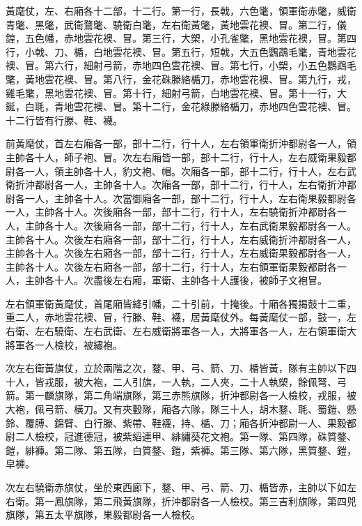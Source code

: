 \begin{pinyinscope}
 黃麾仗，左、右廂各十二部，十二行。第一行，長戟，六色氅，領軍衛赤氅，威衛青氅、黑氅，武衛鶩氅、驍衛白氅，左右衛黃氅，黃地雲花襖、冒。第二行，儀鍠，五色幡，赤地雲花襖、冒。第三行，大槊，小孔雀氅，黑地雲花襖，冒。第四行，小戟、刀、楯，白地雲花襖、冒。第五行，短戟，大五色鸚鵡毛氅，青地雲花襖、冒。第六行，細射弓箭，赤地四色雲花襖、冒。第七行，小槊，小五色鸚鵡毛氅，黃地雲花襖、冒。第八行，金花硃滕絡楯刀，赤地雲花襖、冒。第九行，戎，雞毛氅，黑地雲花襖、冒。第十行，細射弓箭，白地雲花襖、冒。第十一行，大鋋，白毦，青地雲花襖、冒。第十二行，金花綠滕絡楯刀，赤地四色雲花襖、冒。十二行皆有行滕、鞋、襪。



 前黃麾仗，首左右廂各一部，部十二行，行十人，左右領軍衛折沖都尉各一人，領主帥各十人，師子袍、冒。次左右廂皆一部，部十二行，行十人，左右威衛果毅都尉各一人，領主帥各十人，豹文袍、帽。次廂各一部，部十二行，行十人，左右武衛折沖都尉各一人，主帥各十人。次廂各一部，部十二行，行十人，左右衛折沖都尉各一人，主帥各十人。次當御廂各一部，部十二行，行十人，左右衛果毅都尉各一人，主帥各十人。次後廂各一部，部十二行，行十人，左右驍衛折沖都尉各一人，主帥各十人。次後廂各一部，部十二行，行十人，左右武衛果毅都尉各一人。主帥各十人。次後左右廂各一部，部十二行，行十人，左右威衛折沖都尉各一人，主帥各十人。次後左右廂各一部，部十二行，行十人，左右威衛果毅都尉各一人，主帥各十人。次後左右廂各一部，部十二行，行十人，左右領軍衛果毅都尉各一人，主帥各十人。次盡後左右廂，軍衛、主帥各十人護後，被師子文袍冒。



 左右領軍衛黃麾仗，首尾廂皆絳引幡，二十引前，十掩後。十廂各獨揭鼓十二重，重二人，赤地雲花襖、冒，行滕、鞋、襪，居黃麾仗外。每黃麾仗一部，鼓一，左右衛、左右驍衛、左右武衛、左右威衛將軍各一人，大將軍各一人，左右領軍衛大將軍各一人檢校，被繡袍。



 次左右衛黃旗仗，立於兩階之次，鍪、甲、弓、箭、刀、楯皆黃，隊有主帥以下四十人，皆戎服，被大袍，二人引旗，一人執，二人夾，二十人執槊，餘佩弩、弓箭。第一麟旗隊，第二角端旗隊，第三赤熊旗隊，折沖都尉各一人檢校，戎服，被大袍，佩弓箭、橫刀。又有夾轂隊，廂各六隊，隊三十人，胡木鍪、毦、蜀鎧、懸鈴、覆膊、錦臂、白行滕、紫帶、鞋襪，持、楯、刀；廂各折沖都尉一人、果毅都尉二人檢校，冠進德冠，被紫縚連甲、緋繡葵花文袍。第一隊、第四隊，硃質鍪、鎧，緋褲。第二隊、第五隊，白質鍪、鎧，紫褲。第三隊、第六隊，黑質鍪、鎧，皁褲。



 次左右驍衛赤旗仗，坐於東西廊下，鍪、甲、弓、箭、刀、楯皆赤，主帥以下如左右衛。第一鳳旗隊，第二飛黃旗隊，折沖都尉各一人檢校。第三吉利旗隊，第四兕旗隊，第五太平旗隊，果毅都尉各一人檢校。




\end{pinyinscope}

